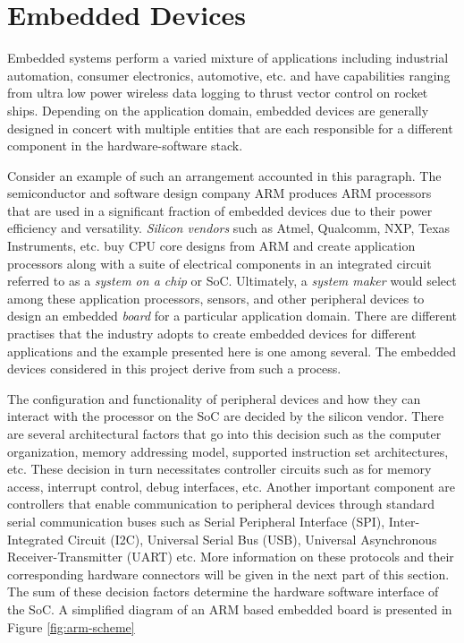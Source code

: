 \section{Embedded Devices}

Embedded systems perform a varied mixture of applications including industrial automation, consumer electronics, automotive, etc. and have capabilities ranging from ultra low power wireless data logging to thrust vector control on rocket ships. Depending on the application domain, embedded devices are generally designed in concert with multiple entities that are each responsible for a different component in the hardware-software stack.

Consider an example of such an arrangement accounted in this paragraph. The semiconductor and software design company ARM produces ARM processors that are used in a significant fraction of embedded devices due to their power efficiency and versatility. \textit{Silicon vendors} such as Atmel, Qualcomm, NXP, Texas Instruments, etc. buy CPU core designs from ARM and create application processors along with a suite of electrical components in an integrated circuit referred to as a \textit{system on a chip} or SoC. Ultimately, a \textit{system maker} would select among these application processors, sensors, and other peripheral devices to design an embedded \textit{board} for a particular application domain. There are different practises that the industry adopts to create embedded devices for different applications and the example presented here is one among several. The embedded devices considered in this project derive from such a process.

The configuration and functionality of peripheral devices and how they can interact with the processor on the SoC are decided by the silicon vendor. There are several architectural factors that go into this decision such as the computer organization, memory addressing model, supported instruction set architectures, etc. These decision in turn necessitates controller circuits such as for memory access, interrupt control, debug interfaces, etc. Another important component are controllers that enable communication to peripheral devices through standard serial communication buses such as Serial Peripheral Interface (SPI), Inter-Integrated Circuit (I2C), Universal Serial Bus (USB), Universal Asynchronous Receiver-Transmitter (UART) etc. More information on these protocols and their corresponding hardware connectors will be given in the next part of this section. The sum of these decision factors determine the hardware software interface of the SoC. A simplified diagram of an ARM based embedded board is presented in Figure \ref{fig:arm-scheme}

